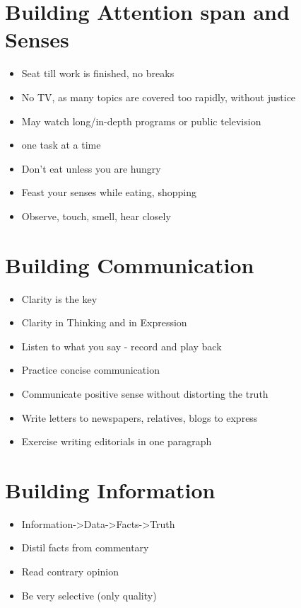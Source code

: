 \begin{multicols}{3}
\section{Building Attention span and Senses}
\begin{itemize}[noitemsep,nolistsep]
\item Seat till work is finished, no breaks
\item No TV, as many topics are covered too rapidly, without justice
\item May watch long/in-depth programs or public television
\item one task at a time
\item Don’t eat unless you are hungry
\item Feast your senses while eating, shopping
\item Observe, touch, smell, hear closely
\end{itemize}

\section{Building Communication}
\begin{itemize}[noitemsep,nolistsep]
\item Clarity is the key
\item Clarity in Thinking and in Expression
\item Listen to what you say - record and play back
\item Practice concise communication
\item Communicate positive sense without distorting the truth
\item Write letters to newspapers, relatives, blogs to express
\item Exercise writing editorials in one paragraph
\end{itemize}

\section{Building Information}
\begin{itemize}[noitemsep,nolistsep]
\item Information->Data->Facts->Truth
\item Distil facts from commentary
\item Read contrary opinion
\item Be very selective (only quality)
\end{itemize}


\end{multicols}
